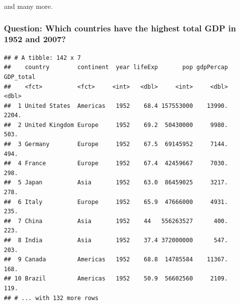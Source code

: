 \documentclass[]{article}
\newenvironment{Shaded}{\begin{snugshade}}{\end{snugshade}}
\newcommand{\KeywordTok}[1]{\textcolor[rgb]{0.13,0.29,0.53}{\textbf{#1}}}
\newcommand{\DecValTok}[1]{\textcolor[rgb]{0.00,0.00,0.81}{#1}}
\newcommand{\StringTok}[1]{\textcolor[rgb]{0.31,0.60,0.02}{#1}}
\newcommand{\OperatorTok}[1]{\textcolor[rgb]{0.81,0.36,0.00}{\textbf{#1}}}
\newcommand{\NormalTok}[1]{#1}
\begin{document}
and many more.

\subsubsection{Question: Which countries have the highest total GDP in
1952 and
2007?}\label{question-which-countries-have-the-highest-total-gdp-in-1952-and-2007}

\begin{Shaded}
\end{Shaded}

\begin{verbatim}
## # A tibble: 142 x 7
##    country        continent  year lifeExp       pop gdpPercap GDP_total
##    <fct>          <fct>     <int>   <dbl>     <int>     <dbl>     <dbl>
##  1 United States  Americas   1952    68.4 157553000    13990.     2204.
##  2 United Kingdom Europe     1952    69.2  50430000     9980.      503.
##  3 Germany        Europe     1952    67.5  69145952     7144.      494.
##  4 France         Europe     1952    67.4  42459667     7030.      298.
##  5 Japan          Asia       1952    63.0  86459025     3217.      278.
##  6 Italy          Europe     1952    65.9  47666000     4931.      235.
##  7 China          Asia       1952    44   556263527      400.      223.
##  8 India          Asia       1952    37.4 372000000      547.      203.
##  9 Canada         Americas   1952    68.8  14785584    11367.      168.
## 10 Brazil         Americas   1952    50.9  56602560     2109.      119.
## # ... with 132 more rows
\end{verbatim}

\begin{Shaded}
\end{Shaded}
\end{document}
